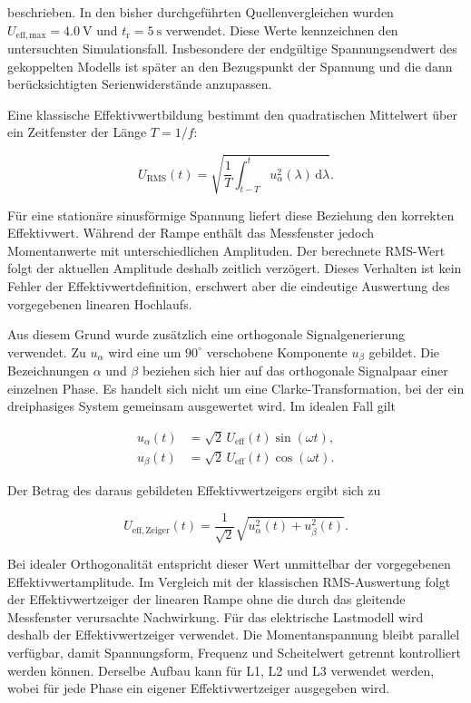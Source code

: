 beschrieben. In den bisher durchgeführten Quellenvergleichen wurden
\(U_\mathrm{eff,max}=\SI{4.0}{\volt}\) und
\(t_\mathrm{r}=\SI{5}{\second}\) verwendet. Diese Werte kennzeichnen den
untersuchten Simulationsfall. Insbesondere der endgültige Spannungsendwert des
gekoppelten Modells ist später an den Bezugspunkt der Spannung und die dann
berücksichtigten Serienwiderstände anzupassen.

Eine klassische Effektivwertbildung bestimmt den quadratischen Mittelwert
über ein Zeitfenster der Länge \(T=1/f\):

\begin{equation}
    U_\mathrm{RMS}(t)
    =
    \sqrt{
        \frac{1}{T}
        \int_{t-T}^{t}u_{\alpha}^{2}(\lambda)\,\mathrm{d}\lambda
    }.
    \label{eq:kap5_rms_fenster}
\end{equation}

Für eine stationäre sinusförmige Spannung liefert diese Beziehung den
korrekten Effektivwert. Während der Rampe enthält das Messfenster jedoch
Momentanwerte mit unterschiedlichen Amplituden. Der berechnete RMS-Wert folgt
der aktuellen Amplitude deshalb zeitlich verzögert. Dieses Verhalten ist kein
Fehler der Effektivwertdefinition, erschwert aber die eindeutige Auswertung
des vorgegebenen linearen Hochlaufs.

Aus diesem Grund wurde zusätzlich eine orthogonale Signalgenerierung
verwendet. Zu \(u_{\alpha}\) wird eine um \(90^\circ\) verschobene Komponente
\(u_{\beta}\) gebildet. Die Bezeichnungen \(\alpha\) und \(\beta\) beziehen
sich hier auf das orthogonale Signalpaar einer einzelnen Phase. Es handelt
sich nicht um eine Clarke-Transformation, bei der ein dreiphasiges System
gemeinsam ausgewertet wird. Im idealen Fall gilt

\begin{align}
    u_{\alpha}(t)
    &=
    \sqrt{2}\,U_\mathrm{eff}(t)\sin(\omega t),
    \\
    u_{\beta}(t)
    &=
    \sqrt{2}\,U_\mathrm{eff}(t)\cos(\omega t).
    \label{eq:kap5_osg_komponenten}
\end{align}

Der Betrag des daraus gebildeten Effektivwertzeigers ergibt sich zu

\begin{equation}
    U_\mathrm{eff,Zeiger}(t)
    =
    \frac{1}{\sqrt{2}}
    \sqrt{u_{\alpha}^{2}(t)+u_{\beta}^{2}(t)}.
    \label{eq:kap5_osg_betrag}
\end{equation}

Bei idealer Orthogonalität entspricht dieser Wert unmittelbar der
vorgegebenen Effektivwertamplitude. Im Vergleich mit der klassischen
RMS-Auswertung folgt der Effektivwertzeiger der linearen Rampe ohne die durch
das gleitende Messfenster verursachte Nachwirkung. Für das elektrische
Lastmodell wird deshalb der Effektivwertzeiger verwendet. Die
Momentanspannung bleibt parallel verfügbar, damit Spannungsform, Frequenz und
Scheitelwert getrennt kontrolliert werden können. Derselbe Aufbau kann für
L1, L2 und L3 verwendet werden, wobei für jede Phase ein eigener
Effektivwertzeiger ausgegeben wird.

